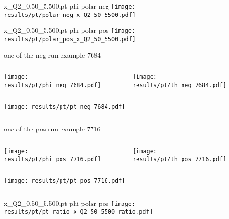 \begin{frame}{x\_Q2\_0.50\_5.500,pt phi polar neg}
\texttt{[image: results/pt/polar\_neg\_x\_Q2\_50\_5500.pdf]}
\end{frame}
\begin{frame}{x\_Q2\_0.50\_5.500,pt phi polar pos}
\texttt{[image: results/pt/polar\_pos\_x\_Q2\_50\_5500.pdf]}
\end{frame}
\begin{frame}{one of the neg run example 7684}
\begin{columns}
\begin{column}[T]{0.5\textwidth}
\texttt{[image: results/pt/phi\_neg\_7684.pdf]}
\end{column}
\begin{column}[T]{0.5\textwidth}
\texttt{[image: results/pt/th\_neg\_7684.pdf]}
\end{column}
\end{columns}
\begin{columns}
\begin{column}[T]{0.5\textwidth}
\texttt{[image: results/pt/pt\_neg\_7684.pdf]}
\end{column}
\begin{column}[T]{0.5\textwidth}
\end{column}
\end{columns}
\end{frame}
\begin{frame}{one of the pos run example 7716}
\begin{columns}
\begin{column}[T]{0.5\textwidth}
\texttt{[image: results/pt/phi\_pos\_7716.pdf]}
\end{column}
\begin{column}[T]{0.5\textwidth}
\texttt{[image: results/pt/th\_pos\_7716.pdf]}
\end{column}
\end{columns}
\begin{columns}
\begin{column}[T]{0.5\textwidth}
\texttt{[image: results/pt/pt\_pos\_7716.pdf]}
\end{column}
\begin{column}[T]{0.5\textwidth}
\end{column}
\end{columns}
\end{frame}
\begin{frame}{x\_Q2\_0.50\_5.500,pt phi polar pos}
\texttt{[image: results/pt/pt\_ratio\_x\_Q2\_50\_5500\_ratio.pdf]}
\end{frame}
